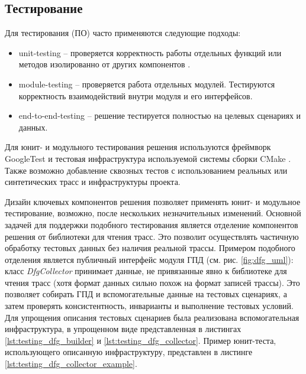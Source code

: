 \subsection{Тестирование}

Для тестирования  (ПО) часто применяются следующие подходы:

\begin{itemize}
    \item \gls{unit-testing} -- проверяется корректность работы отдельных функций или методов изолированно от других компонентов \cite{googletest_documentation,catch2_documentation,boost_test_documentation}.
    \item \gls{module-testing} -- проверяется работа отдельных модулей. Тестируются корректность взаимодействий внутри модуля и его интерфейсов.
    \item \gls{end-to-end-testing} -- решение тестируется полностью на целевых сценариях и данных.
\end{itemize}

Для юнит- и модульного тестирования решения используются фреймворк GoogleTest \cite{googletest_documentation} и тестовая инфраструктура используемой системы сборки CMake \cite{cmake_ctest_documentation,hoffman_martin_cmake}. Также возможно добавление сквозных тестов с использованием реальных или синтетических трасс и инфраструктуры проекта.

Дизайн ключевых компонентов решения позволяет применять юнит- и модульное тестирование, возможно, после нескольких незначительных изменений. Основной задачей для поддержки подобного тестирования является отделение компонентов решения от библиотеки для чтения трасс. Это позволит осуществлять частичную обработку тестовых данных без наличия реальной трассы. Примером подобного отделения является публичный интерфейс модуля ГПД (см. рис. \ref{fig:dfg_uml}): класс \textit{DfgCollector} принимает данные, не привязанные явно к библиотеке для чтения трасс (хотя формат данных сильно похож на формат записей трассы). Это позволяет собирать ГПД и вспомогательные данные на тестовых сценариях, а затем проверять консистентность, инварианты и выполнение тестовых условий. Для упрощения описания тестовых сценариев была реализована вспомогательная инфраструктура, в упрощенном виде представленная в листингах \ref{lst:testing_dfg_builder} и \ref{lst:testing_dfg_collector}. Пример юнит-теста, использующего описанную инфраструктуру, представлен в листинге \ref{lst:testing_dfg_collector_example}.

